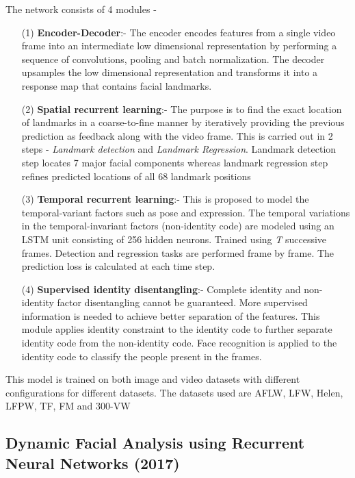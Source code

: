 \documentclass{llncs}
\begin{document}
The network consists of 4 modules -
\begin{itemize}
\item[(1)] \textbf{Encoder-Decoder}:-
The encoder encodes features from a single video frame into an intermediate low dimensional representation by performing a sequence of convolutions, pooling and batch normalization. The decoder upsamples the low dimensional representation and transforms it into a response map that contains facial landmarks.\\


\item[(2)] \textbf{Spatial recurrent learning}:-
The purpose is to find the exact location of landmarks in a coarse-to-fine manner by iteratively providing the previous prediction as feedback along with the video frame. This is carried out in 2 steps - \textit{Landmark detection} and \textit{Landmark Regression}. Landmark detection step locates 7 major facial components whereas landmark regression step refines predicted locations of all 68 landmark positions\\

\item[(3)] \textbf{Temporal recurrent learning}:-
This is proposed to model the temporal-variant factors such as pose and expression. The temporal variations in the temporal-invariant factors (non-identity code) are modeled using an LSTM unit consisting of 256 hidden neurons.
Trained using \textit{T} successive frames. Detection and regression tasks are performed frame by frame. The prediction loss is calculated at each time step. 
\\

\item[(4)] \textbf{Supervised identity disentangling}:-
Complete identity and non-identity factor disentangling cannot be guaranteed. More supervised information is needed to achieve better separation of the features. This module applies identity constraint to the identity code to further separate identity code from the non-identity code. Face recognition is applied to the identity code to classify the people present in the frames. \\
\end{itemize}

This model is trained on both image and video datasets with different configurations for different datasets. The datasets used are AFLW, LFW, Helen, LFPW, TF, FM and 300-VW

\subsection{Dynamic Facial Analysis using Recurrent Neural Networks (2017)}
\end{document}
